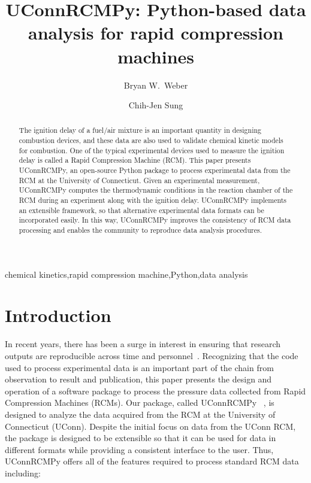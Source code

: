 \documentclass[12pt]{../ussci}
\title{ UConnRCMPy: Python-based data analysis for rapid compression machines }
\author[1*]{Bryan W.\ Weber}
\author[1]{Chih-Jen Sung}
\affil[1]{Department of Mechanical Engineering, University of Connecticut, Storrs,
CT, USA}
\affil[*]{Corresponding Author: \email{bryan.weber@uconn.edu}}
\begin{document}
\maketitle

\begin{abstract} %
    The ignition delay of a fuel/air mixture is an important quantity in
    designing combustion devices, and these data are also used to validate
    chemical kinetic models for combustion. One of the typical experimental
    devices used to measure the ignition delay is called a Rapid Compression
    Machine (RCM). This paper presents UConnRCMPy, an open-source Python package
    to process experimental data from the RCM at the University of Connecticut.
    Given an experimental measurement, UConnRCMPy computes the thermodynamic
    conditions in the reaction chamber of the RCM during an experiment along
    with the ignition delay. UConnRCMPy implements an extensible framework, so
    that alternative experimental data formats can be incorporated easily. In
    this way, UConnRCMPy improves the consistency of RCM data processing and
    enables the community to reproduce data analysis procedures.
\end{abstract}

\begin{keyword}
    chemical kinetics\sep rapid compression machine\sep Python\sep data analysis
\end{keyword}

\section{Introduction}\label{introduction}

In recent years, there has been a surge in interest in ensuring that research
outputs are reproducible across time and personnel~\autocite{NatureEds2016}.
Recognizing that the code used to process experimental data is an important part
of the chain from observation to result and publication, this paper presents the
design and operation of a software package to process the pressure data
collected from Rapid Compression Machines (RCMs). Our package, called UConnRCMPy
~\autocite{uconnrcmpy}, is designed to analyze the data acquired from the RCM at
the University of Connecticut (UConn). Despite the initial focus on data from
the UConn RCM, the package is designed to be extensible so that it can be used
for data in different formats while providing a consistent interface to the
user. Thus, UConnRCMPy offers all of the features required to process standard
RCM data including:
\end{document}
